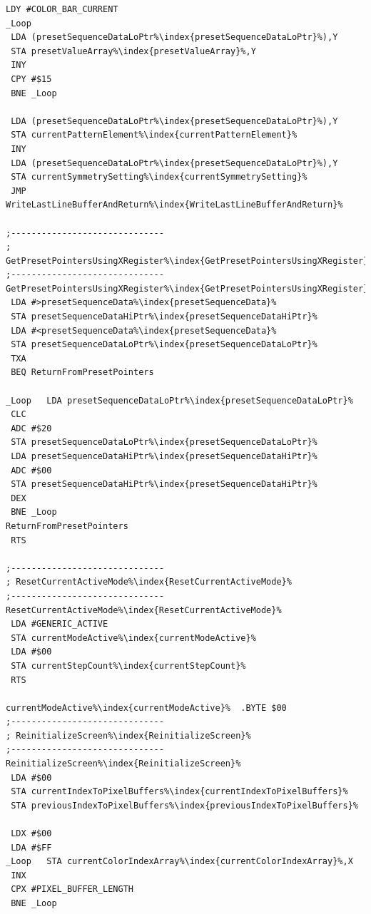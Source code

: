 \begin{minipage}[b]{0.33\linewidth}
\begin{lrbox}{\mybox}%
\begin{lstlisting}[basicstyle=\ttfamily\tiny,escapechar=\%]
 LDY #COLOR_BAR_CURRENT
_Loop   
 LDA (presetSequenceDataLoPtr%\index{presetSequenceDataLoPtr}%),Y
 STA presetValueArray%\index{presetValueArray}%,Y
 INY
 CPY #$15
 BNE _Loop

 LDA (presetSequenceDataLoPtr%\index{presetSequenceDataLoPtr}%),Y
 STA currentPatternElement%\index{currentPatternElement}%
 INY
 LDA (presetSequenceDataLoPtr%\index{presetSequenceDataLoPtr}%),Y
 STA currentSymmetrySetting%\index{currentSymmetrySetting}%
 JMP WriteLastLineBufferAndReturn%\index{WriteLastLineBufferAndReturn}%

;------------------------------
; GetPresetPointersUsingXRegister%\index{GetPresetPointersUsingXRegister}%
;------------------------------
GetPresetPointersUsingXRegister%\index{GetPresetPointersUsingXRegister}%
 LDA #>presetSequenceData%\index{presetSequenceData}%
 STA presetSequenceDataHiPtr%\index{presetSequenceDataHiPtr}%
 LDA #<presetSequenceData%\index{presetSequenceData}%
 STA presetSequenceDataLoPtr%\index{presetSequenceDataLoPtr}%
 TXA
 BEQ ReturnFromPresetPointers

_Loop   LDA presetSequenceDataLoPtr%\index{presetSequenceDataLoPtr}%
 CLC
 ADC #$20
 STA presetSequenceDataLoPtr%\index{presetSequenceDataLoPtr}%
 LDA presetSequenceDataHiPtr%\index{presetSequenceDataHiPtr}%
 ADC #$00
 STA presetSequenceDataHiPtr%\index{presetSequenceDataHiPtr}%
 DEX
 BNE _Loop
ReturnFromPresetPointers
 RTS

;------------------------------
; ResetCurrentActiveMode%\index{ResetCurrentActiveMode}%
;------------------------------
ResetCurrentActiveMode%\index{ResetCurrentActiveMode}%
 LDA #GENERIC_ACTIVE
 STA currentModeActive%\index{currentModeActive}%
 LDA #$00
 STA currentStepCount%\index{currentStepCount}%
 RTS

currentModeActive%\index{currentModeActive}%  .BYTE $00
;------------------------------
; ReinitializeScreen%\index{ReinitializeScreen}%
;------------------------------
ReinitializeScreen%\index{ReinitializeScreen}%
 LDA #$00
 STA currentIndexToPixelBuffers%\index{currentIndexToPixelBuffers}%
 STA previousIndexToPixelBuffers%\index{previousIndexToPixelBuffers}%

 LDX #$00
 LDA #$FF
_Loop   STA currentColorIndexArray%\index{currentColorIndexArray}%,X
 INX
 CPX #PIXEL_BUFFER_LENGTH
 BNE _Loop


\end{lstlisting}
\end{lrbox}
\end{minipage}
